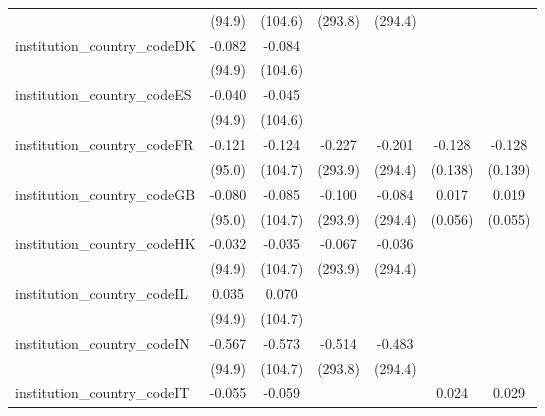 \begin{tabular}{lcccccc}
                                         & (94.9)        & (104.6)       & (293.8)       & (294.4)       &               &   \\   
   institution\_country\_codeDK          & -0.082        & -0.084        &               &               &               &   \\   
                                         & (94.9)        & (104.6)       &               &               &               &   \\   
   institution\_country\_codeES          & -0.040        & -0.045        &               &               &               &   \\   
                                         & (94.9)        & (104.6)       &               &               &               &   \\   
   institution\_country\_codeFR          & -0.121        & -0.124        & -0.227        & -0.201        & -0.128        & -0.128\\   
                                         & (95.0)        & (104.7)       & (293.9)       & (294.4)       & (0.138)       & (0.139)\\   
   institution\_country\_codeGB          & -0.080        & -0.085        & -0.100        & -0.084        & 0.017         & 0.019\\   
                                         & (95.0)        & (104.7)       & (293.9)       & (294.4)       & (0.056)       & (0.055)\\   
   institution\_country\_codeHK          & -0.032        & -0.035        & -0.067        & -0.036        &               &   \\   
                                         & (94.9)        & (104.7)       & (293.9)       & (294.4)       &               &   \\   
   institution\_country\_codeIL          & 0.035         & 0.070         &               &               &               &   \\   
                                         & (94.9)        & (104.7)       &               &               &               &   \\   
   institution\_country\_codeIN          & -0.567        & -0.573        & -0.514        & -0.483        &               &   \\   
                                         & (94.9)        & (104.7)       & (293.8)       & (294.4)       &               &   \\   
   institution\_country\_codeIT          & -0.055        & -0.059        &               &               & 0.024         & 0.029\\   

\end{tabular}
